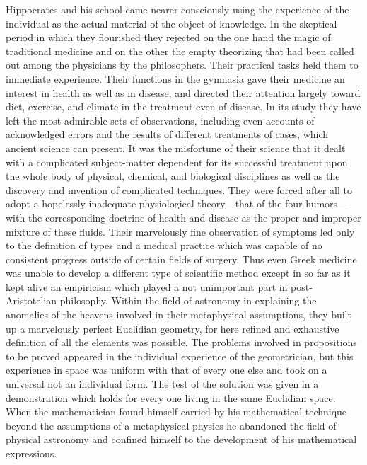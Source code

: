 \documentclass[12pt]{article}
\begin{document}
Hippocrates and his school came nearer consciously
using the experience of the individual as the actual
material of the object of knowledge. In the skeptical
period in which they flourished they rejected on the
one hand the magic of traditional medicine and on the
other the empty theorizing that had been called out
among the physicians by the philosophers. Their practical
tasks held them to immediate experience. Their
functions in the gymnasia gave their medicine an interest
in health as well as in disease, and directed their
attention largely toward diet, exercise, and climate
in the treatment even of disease. In its study they have
left the most admirable sets of observations, including
even accounts of acknowledged errors and the results
of different treatments of cases, which ancient science
can present. It was the misfortune of their science
that it dealt with a complicated subject-matter dependent
for its successful treatment upon the whole
body of physical, chemical, and biological disciplines
as well as the discovery and invention of complicated
techniques. They were forced after all to adopt a
hopelessly inadequate physiological theory—that of
the four humors—with the corresponding doctrine of
health and disease as the proper and improper mixture
of these fluids. Their marvelously fine observation
of symptoms led only to the definition of types and a
medical practice which was capable of no consistent
progress outside of certain fields of surgery. Thus
even Greek medicine was unable to develop a different
type of scientific method except in so far as it kept alive
an empiricism which played a not unimportant part
in post-Aristotelian philosophy. Within the field of
astronomy in explaining the anomalies of the heavens
involved in their metaphysical assumptions, they built
up a marvelously perfect Euclidian geometry, for here
refined and exhaustive definition of all the elements was
possible. The problems involved in propositions to be
proved appeared in the individual experience of the
geometrician, but this experience in space was uniform
with that of every one else and took on a universal not
an individual form. The test of the solution was given
in a demonstration which holds for every one living
in the same Euclidian space. When the mathematician
found himself carried by his mathematical technique
beyond the assumptions of a metaphysical physics he
abandoned the field of physical astronomy and confined
himself to the development of his mathematical expressions.
\end{document}
